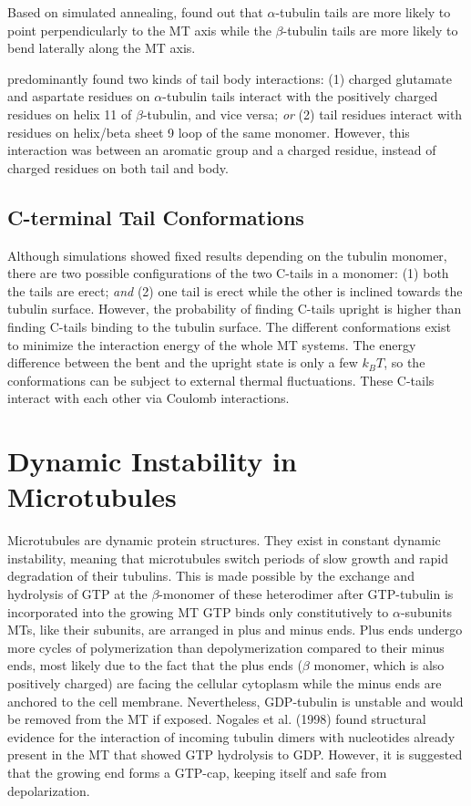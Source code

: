 \documentclass[letterpaper,final,times]{cas-dc}
\numberwithin{equation}{section}
\begin{document}
Based on simulated annealing, \citet{83} found out that $\alpha$-tubulin tails are more likely to point perpendicularly to the MT axis while the $\beta$-tubulin tails are more likely to bend laterally along the MT axis.

\citet{83} predominantly found two kinds of tail body interactions: (1) charged
glutamate and aspartate residues on $\alpha$-tubulin tails interact with the positively charged
residues on helix 11 of $\beta$-tubulin, and vice versa; \textit{or} (2) tail residues interact with residues on helix/beta sheet 9 loop of the same monomer. However, this interaction was between an aromatic group and a charged residue, instead of charged residues on both tail and body.

\subsection{C-terminal Tail Conformations}
Although \citet{83} simulations showed fixed results depending on the tubulin monomer, there are two possible configurations of the two C-tails in a monomer: (1) both the tails are erect; \textit{and} (2) one tail is erect while the other is inclined towards the tubulin surface\citep{82}. However, the probability of finding C-tails upright is higher than finding C-tails binding to the tubulin surface. The different conformations exist to minimize the interaction energy of the whole MT systems. The energy difference between the bent and the upright state is only a few $k_BT$, so the conformations can be subject to external thermal fluctuations\citep{82}. These C-tails interact with each other via Coulomb interactions.

\section{Dynamic Instability in Microtubules}
Microtubules are dynamic protein structures. They exist in constant dynamic instability, meaning that microtubules switch periods of slow growth and rapid degradation of their tubulins\citep{17}. This is made possible by the exchange and hydrolysis of GTP at the $\beta$-monomer of these heterodimer after GTP-tubulin is incorporated into the growing MT GTP binds only constitutively to $\alpha$-subunits MTs, like their subunits, are arranged in plus and minus ends. Plus ends undergo more cycles of polymerization than depolymerization compared to their minus ends\citep{18}, most likely due to the fact that the plus ends ($\beta$ monomer, which is also positively charged) are facing the cellular cytoplasm while the minus ends are anchored to the cell membrane\citep{4}. Nevertheless, GDP-tubulin is unstable and would be removed from the MT if exposed. Nogales et al. (1998) found structural evidence for the interaction of incoming tubulin dimers with nucleotides already present in the MT that showed GTP hydrolysis to GDP. However, it is suggested that the growing end forms a GTP-cap, keeping itself and safe from depolarization\citep{17}.
\end{document}

